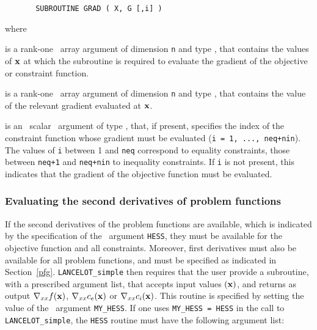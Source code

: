 \documentclass{galahad}
\begin{document}
\def\baselinestretch{0.8}
{\tt \begin{verbatim}
       SUBROUTINE GRAD ( X, G [,i] )
\end{verbatim} }
\def\baselinestretch{1.0}
\noindent
where
\begin{description}
 is a rank-one \intentin\ array argument of
dimension {\tt n} and type \realdp,
that contains the values of ${\mathbf{x}}$ at which the
subroutine is required to evaluate the gradient
of the objective or constraint function.

 is a rank-one \intentout\ array argument of dimension {\tt n}  and
  type \realdp, that contains the value of the relevant
  gradient evaluated at ${\mathbf{x}}$.

 is an \optional\ scalar \intentin\ argument of type \integer,
that, if present, specifies the index of the constraint function whose
gradient must be evaluated  ({\tt i = 1, ..., neq+nin}).  The values of {\tt i}
between 1 and {\tt neq} correspond to equality constraints, those between
{\tt neq+1} and {\tt neq+nin} to inequality constraints. If {\tt i} is not
present, this indicates that the gradient of the objective function must be
evaluated.
\end{description}

\subsubsection{Evaluating the second derivatives of problem
functions\label{pfh}}

If the second derivatives of the problem functions are available, which is
indicated by the specification of the \optional\ argument {\tt HESS}, they must
be available for the objective function and all constraints. Moreover, first
derivatives must also be available for all problem functions, and must be
specified as indicated in Section~\ref{pfg}.
{\tt LANCELOT\_simple} then requires that the user provide a subroutine, with
a prescribed argument list, that accepts input values $({\mathbf{x}})$, and returns as
output  $\nabla_{xx}f({\mathbf{x}})$,  $\nabla_{xx}c_e({\mathbf{x}})$ or
$\nabla_{xx}c_i({\mathbf{x}})$. This routine is specified by setting the value of the
\optional\ argument {\tt MY\_HESS}. If one uses {\tt MY\_HESS = HESS} in the
call to {\tt LANCELOT\_simple}, the {\tt HESS} routine must have the following
argument list:
\end{document}
